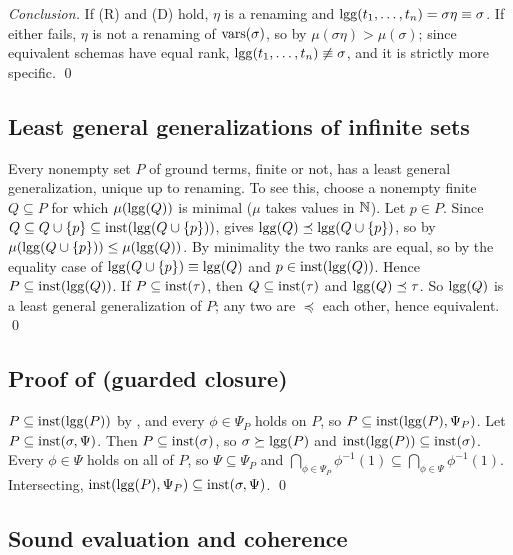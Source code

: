 \emph{Conclusion.} If (R) and (D) hold, $\eta$ is a renaming and
$\mathrm{lgg}(t_1,\dots,t_n)=\sigma\eta\equiv\sigma$. If either fails, $\eta$ is not a
renaming of $\mathrm{vars}(\sigma)$, so by 
$\mu(\sigma\eta)>\mu(\sigma)$; since equivalent schemas have equal rank,
$\mathrm{lgg}(t_1,\dots,t_n)\not\equiv\sigma$, and it is strictly more specific. \qed

\subsection{Least general generalizations of infinite sets}\label{app:setting:infinite}

Every nonempty set $P$ of ground terms, finite or not, has a least general
generalization, unique up to renaming. To see this, choose a nonempty finite
$Q\subseteq P$ for which $\mu(\mathrm{lgg}(Q))$ is minimal ($\mu$ takes values in $\mathbb{N}$).
Let $p\in P$. Since $Q\subseteq Q\cup\{p\}\subseteq\mathrm{inst}(\mathrm{lgg}(Q\cup\{p\}))$,
 gives $\mathrm{lgg}(Q)\preceq\mathrm{lgg}(Q\cup\{p\})$, so by
 $\mu(\mathrm{lgg}(Q\cup\{p\}))\le\mu(\mathrm{lgg}(Q))$. By minimality the
two ranks are equal, so by the equality case of 
$\mathrm{lgg}(Q\cup\{p\})\equiv\mathrm{lgg}(Q)$ and $p\in\mathrm{inst}(\mathrm{lgg}(Q))$. Hence
$P\subseteq\mathrm{inst}(\mathrm{lgg}(Q))$. If $P\subseteq\mathrm{inst}(\tau)$, then
$Q\subseteq\mathrm{inst}(\tau)$ and $\mathrm{lgg}(Q)\preceq\tau$. So $\mathrm{lgg}(Q)$ is a least general
generalization of $P$; any two are $\preceq$ each other, hence equivalent. \qed

\subsection{Proof of \texorpdfstring{}{the guarded closure lemma} (guarded closure)}

$P\subseteq\mathrm{inst}(\mathrm{lgg}(P))$ by , and every $\phi\in\Psi_P$
holds on $P$, so $P\subseteq\mathrm{inst}(\mathrm{lgg}(P),\Psi_P)$. Let
$P\subseteq\mathrm{inst}(\sigma,\Psi)$. Then $P\subseteq\mathrm{inst}(\sigma)$, so
$\sigma\succeq\mathrm{lgg}(P)$ and $\mathrm{inst}(\mathrm{lgg}(P))\subseteq\mathrm{inst}(\sigma)$. Every
$\phi\in\Psi$ holds on all of $P$, so $\Psi\subseteq\Psi_P$ and
$\bigcap_{\phi\in\Psi_P}\phi^{-1}(1)\subseteq\bigcap_{\phi\in\Psi}\phi^{-1}(1)$.
Intersecting, $\mathrm{inst}(\mathrm{lgg}(P),\Psi_P)\subseteq\mathrm{inst}(\sigma,\Psi)$. \qed

\subsection{Sound evaluation and coherence}\label{app:setting:WS}

